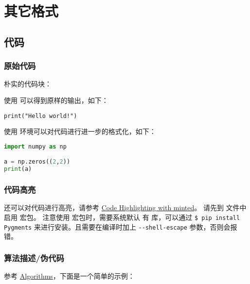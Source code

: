 
\chapter{其它格式}
\section{代码}
\subsection{原始代码}
朴实的代码块：

使用  可以得到原样的输出，如下：

\begin{verbatim}
print("Hello world!")
\end{verbatim}

使用  环境可以对代码进行进一步的格式化，如下：

\lstset{basicstyle=\ttfamily,breaklines=true}
\begin{lstlisting}[language=Python,frame=single]
import numpy as np

a = np.zeros((2,2))
print(a)
\end{lstlisting}

\subsection{代码高亮}
还可以对代码进行高亮，请参考 \href{https://www.overleaf.com/learn/latex/Code_Highlighting_with_minted}{Code Highlighting with minted}。
请先到  文件中启用  宏包。
注意使用  宏包时，需要系统默认  有  库，可以通过 \verb|$ pip install Pygments| 来进行安装。且需要在编译时加上 \verb|--shell-escape| 参数，否则会报错。



\subsection{算法描述/伪代码}
参考 \href{https://en.wikibooks.org/wiki/LaTeX/Algorithms}{Algorithms}，下面是一个简单的示例：

